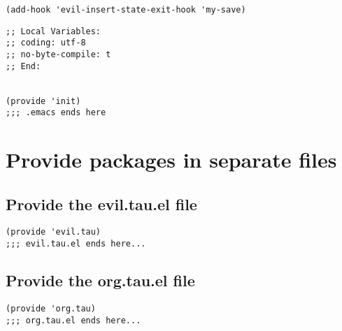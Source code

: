 \documentclass[11pt]{article}
\begin{document}
\begin{verbatim}
(add-hook 'evil-insert-state-exit-hook 'my-save)
\end{verbatim}



\begin{verbatim}
;; Local Variables:
;; coding: utf-8
;; no-byte-compile: t
;; End:


(provide 'init)
;;; .emacs ends here

\end{verbatim}





\section*{Provide packages in separate files}
\label{sec:orgabf3fae}

\subsection*{Provide the evil.tau.el file}
\label{sec:orga6db98c}
\begin{verbatim}
(provide 'evil.tau)
;;; evil.tau.el ends here...
\end{verbatim}

\subsection*{Provide the org.tau.el file}
\label{sec:org0673965}

\begin{verbatim}
(provide 'org.tau)
;;; org.tau.el ends here...
\end{verbatim}
\end{document}
